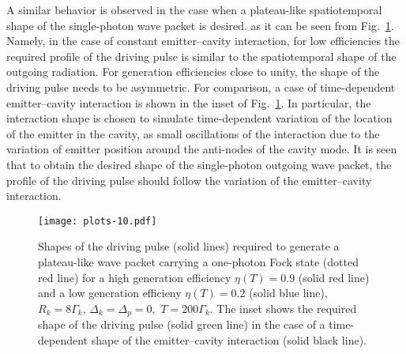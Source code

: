 \documentclass[pra, twocolumn]{revtex4}
\begin{document}
A similar behavior is observed in the case when a plateau-like
spatiotemporal shape of the single-photon wave packet is desired.
as it can be seen from Fig.~\ref{fig8}.
Namely, in the case of constant emitter--cavity interaction,  
for low efficiencies the required profile of the driving
pulse is similar to the spatiotemporal shape of the outgoing
radiation. For generation efficiencies close to unity, the
%
shape
of the driving
pulse needs to be asymmetric.
%
For comparison, a case of time-dependent emitter--cavity interaction
is shown in the inset of Fig.~\ref{fig8}.
%
In particular, the interaction shape is chosen to simulate 
time-dependent variation of the location of the emitter in the cavity, 
 as
small oscillations of the interaction due to the variation of emitter
position around the anti-nodes of the cavity mode.
%
It is seen that to
obtain the desired shape of the single-photon outgoing wave packet,
the profile of the driving pulse should follow the variation of the
emitter--cavity interaction.
\begin{figure}[t!]
	\texttt{[image: plots-10.pdf]}
 	\caption{
          Shapes
          of the driving pulse (solid lines) required to
          generate
%         
          a plateau-like wave packet carrying a one-photon Fock state
          (dotted red line) for a high generation efficiency $\eta(T)=0.9$
          (solid red line) and a low generation efficieny
          $\eta(T)=0.2$ (solid blue line), $R_k = 8\Gamma_k$, \mbox{$\Delta_k =
          \Delta_p = 0$, $T = 200 \Gamma_k$}. The inset shows the required
%          
          shape
          of the driving pulse (solid green line) in the case of a time-dependent
          shape of the emitter--cavity interaction
%
          (solid black line).}
	\label{fig8}
\end{figure}
% 
% 
%       


\end{document}
